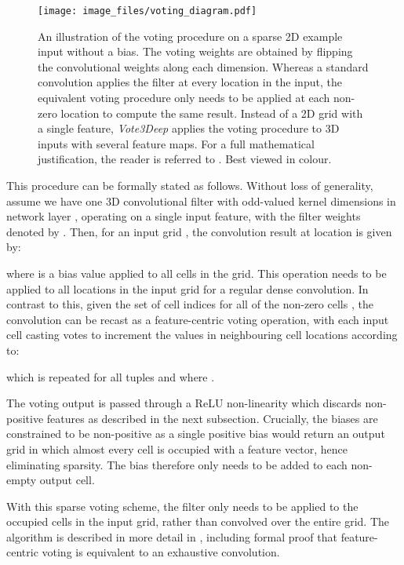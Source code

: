 \documentclass[letterpaper, 10 pt, conference]{tex_style/ieeeconf}
\begin{document}
\begin{figure}[t]
    \centering
    \texttt{[image: image\_files/voting\_diagram.pdf]}
    \caption{An illustration of the voting procedure on a sparse 2D example input without a bias. The voting weights are obtained by flipping the convolutional weights along each dimension. Whereas a standard convolution applies the filter at every location in the input, the equivalent voting procedure only needs to be applied at each non-zero location to compute the same result. Instead of a 2D grid with a single feature, \emph{Vote3Deep} applies the voting procedure to 3D inputs with several feature maps. For a full mathematical justification, the reader is referred to \cite{wang2015voting}. Best viewed in colour.
    \label{fig:voting}
    }
\end{figure}

This procedure can be formally stated as follows.
Without loss of generality, assume we have one 3D convolutional filter with odd-valued kernel dimensions in network layer , operating on a single input feature, with the filter weights denoted by .
Then, for an input grid , the convolution result at location  is given by:

\noindent where  is a bias value applied to all cells in the grid.
This operation needs to be applied to all  locations in the input grid for a regular dense convolution.
In contrast to this, given the set of cell indices for all of the non-zero cells , the convolution can be recast as a feature-centric voting operation, with each input cell casting votes to increment the values in neighbouring cell locations according to:

which is repeated for all tuples  and where .

The voting output is passed through a ReLU non-linearity which discards non-positive features as described in the next subsection.
Crucially, the biases are constrained to be non-positive as a single positive bias would return an output grid in which almost every cell is occupied with a feature vector, hence eliminating sparsity.
The bias  therefore only needs to be added to each non-empty output cell.

With this sparse voting scheme, the filter only needs to be applied to the occupied cells in the input grid, rather than convolved over the entire grid.
The algorithm is described in more detail in \cite{wang2015voting}, including formal proof that feature-centric voting is equivalent to an exhaustive convolution.
\end{document}
